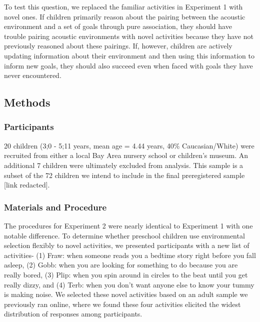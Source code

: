\documentclass[10pt, letterpaper]{article}
\begin{document}
To test this question, we replaced the familiar activities in Experiment
1 with novel ones. If children primarily reason about the pairing
between the acoustic environment and a set of goals through pure
association, they should have trouble pairing acoustic environments with
novel activities because they have not previously reasoned about these
pairings. If, however, children are actively updating information about
their environment and then using this information to inform new goals,
they should also succeed even when faced with goals they have never
encountered.

\hypertarget{methods-1}{%
\subsection{Methods}\label{methods-1}}

\hypertarget{participants-1}{%
\subsubsection{Participants}\label{participants-1}}

20 children (3;0 - 5;11 years, mean age = 4.44 years, 40\%
Caucasian/White) were recruited from either a local Bay Area nursery
school or children's museum. An additional 7 children were ultimately
excluded from analysis. This sample is a subset of the 72 children we
intend to include in the final preregistered sample {[}link redacted{]}.

\hypertarget{materials-and-procedure-1}{%
\subsubsection{Materials and
Procedure}\label{materials-and-procedure-1}}

The procedures for Experiment 2 were nearly identical to Experiment 1
with one notable difference. To determine whether preschool children use
environmental selection flexibly to novel activities, we presented
participants with a new list of activities- (1) Fraw: when someone reads
you a bedtime story right before you fall asleep, (2) Gobb: when you are
looking for something to do because you are really bored, (3) Plip: when
you spin around in circles to the beat until you get really dizzy, and
(4) Terb: when you don't want anyone else to know your tummy is making
noise. We selected these novel activities based on an adult sample we
previously ran online, where we found these four activities elicited the
widest distribution of responses among participants.
\end{document}
